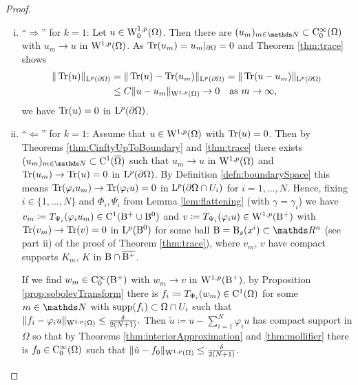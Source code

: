\begin{proof}
  \begin{enumerate}[i)]
    \item ``$\Rightarrow$'' for $k = 1$:
      Let $u \in \mathrm{W}_0^{1,p}(\Omega)$.
      Then there are $(u_m)_{m \in \N} \subset \CC_0^\infty(\Omega)$ with $u_m \to u$ in $\mathrm{W}^{1,p}(\Omega)$.
      As $\operatorname{Tr}(u_m) = u_m|_{\partial\Omega} = 0$ and Theorem \ref{thm:trace} shows
      \begin{align*}
        \| \operatorname{Tr}(u) \|_{\mathrm{L}^p(\partial\Omega)}
        &= \|\operatorname{Tr}(u) - \operatorname{Tr}(u_m)\|_{\mathrm{L}^p(\partial\Omega)}
        = \| \operatorname{Tr}(u - u_m) \|_{\mathrm{L}^p(\partial\Omega)} \\
        &\leq C \|u - u_m\|_{\mathrm{W}^{1,p}(\Omega)} \to 0 \quad \text{as } m \to \infty,
      \end{align*}
      we have $\operatorname{Tr}(u) = 0$ in $\mathrm{L}^p(\partial\Omega)$.

    \item ``$\Leftarrow$'' for $k = 1$:
    Assume that $u \in \mathrm{W}^{1,p}(\Omega)$ with $\operatorname{Tr}(u) = 0$.
    Then by Theorems \ref{thm:CinftyUpToBoundary} and \ref{thm:trace} there exists $(u_m)_{m \in \N} \subset \CC^1(\overline\Omega)$ such that $u_m \to u$ in $\mathrm{W}^{1,p}(\Omega)$ and $\operatorname{Tr}(u_m) \to \operatorname{Tr}(u) = 0$ in $\mathrm{L}^p(\partial\Omega)$.
    By Definition \ref{defn:boundarySpace} this means $\operatorname{Tr}(\varphi_i u_m) \to \operatorname{Tr}(\varphi_i u) = 0$ in $\mathrm{L}^p(\partial\Omega \cap U_i)$ for $i = 1,\dots,N$.
    Hence, fixing $i \in \{1, \dots, N\}$ and $\Phi_i, \Psi_i$ from Lemma \ref{lem:flattening} (with $\gamma = \gamma_i$) we have $v_m \coloneqq T_{\Psi_i}(\varphi_i u_m) \in \mathrm{C}^1(\mathrm{B}^+ \cup \mathrm{B}^0)$ and $v \coloneqq T_{\Psi_i}(\varphi_i u) \in \mathrm{W}^{1,p}(\mathrm{B}^+)$ with $\operatorname{Tr}(v_m) \to \operatorname{Tr}(v) = 0$ in $\mathrm{L}^p(\mathrm{B}^0)$ for some ball $\BB = \BB_s(x^i) \subset \R^n$ (see part ii) of the proof of Theorem \ref{thm:trace}), where $v_m$, $v$ have compact supports $K_m$, $K$ in $\mathrm{B} \cap \overline{\mathrm{B}^+}$.

    If we find $w_m \in \mathrm{C}_0^\infty(\mathrm{B}^+)$ with $w_m \to v$ in $\mathrm{W}^{1,p}(\mathrm{B}^+)$, by Proposition \ref{prop:sobolevTransform} there is $f_i \coloneqq T_{\Phi_i}(w_m) \in \mathrm{C}^1(\Omega)$ for some $m \in \N$ with $\operatorname{supp}(f_i) \subset \Omega \cap U_i$ such that 
    $\|f_i - \varphi_i u\|_{\mathrm{W}^{1,p}(\Omega)} \leq \frac{\delta}{2(N + 1)}.$
    Then $\tilde u \coloneqq u - \sum_{i = 1}^N \varphi_i u$ has compact support in $\Omega$ so that by Theorems \ref{thm:interiorApproximation} and \ref{thm:mollifier} there is $f_0 \in \mathrm{C}_0^\infty(\Omega)$ such that 
    $\| \tilde u - f_0 \|_{\mathrm{W}^{1,p}(\Omega)} \leq \frac{\delta}{2(N + 1)}.$


\end{enumerate}
\end{proof}

